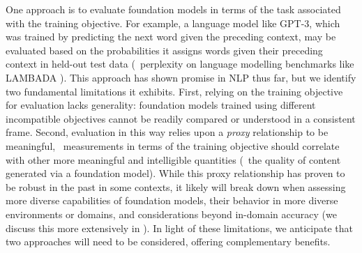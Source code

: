 One approach is to evaluate foundation models in terms of the task associated with the training objective.
For example, a language model like GPT-3, which was trained by predicting the next word given the preceding context, may be evaluated based on the probabilities it assigns words given their preceding context in held-out test data (\ie~perplexity on language modelling benchmarks like LAMBADA \citep{paperno2016lambada}).
This approach has shown promise in NLP thus far, but we identify two fundamental limitations it exhibits.
First, relying on the training objective for evaluation lacks generality: foundation models trained using different incompatible objectives cannot be readily compared or understood in a consistent frame.
Second, evaluation in this way relies upon a \textit{proxy} relationship to be meaningful, \ie~measurements in terms of the training objective should correlate with other more meaningful and intelligible quantities (\eg~the quality of content generated via a foundation model).
While this proxy relationship has proven to be robust in the past in some contexts, it likely will break down when assessing more diverse capabilities of foundation models, their behavior in more diverse environments or domains, and considerations beyond in-domain accuracy (we discuss this more extensively in ).
In light of these limitations, we anticipate that two approaches will need to be considered, offering complementary benefits.

